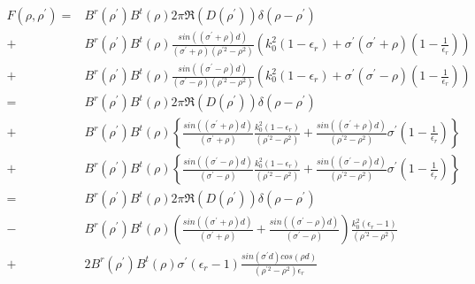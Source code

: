 \documentclass[11pt, oneside]{article}   	%
\begin{document}
\begin{align*}
F\left(\rho,\rho^{\prime}\right)= & B^{r}\left(\rho^{\prime}\right)B^{t}\left(\rho\right)2\pi\Re\left(D\left(\rho^{\prime}\right)\right)\delta\left(\rho-\rho^{\prime}\right)\\
+ & B^{r}\left(\rho^{\prime}\right)B^{t}\left(\rho\right)\frac{sin\left(\left(\sigma^{\prime}+\rho\right)d\right)}{\left(\sigma^{\prime}+\rho\right)\left(\rho^{\prime2}-\rho^{2}\right)}\left(k_{0}^{2}\left(1-\epsilon_{r}\right)+\sigma^{\prime}\left(\sigma^{\prime}+\rho\right)\left(1-\frac{1}{\epsilon_{r}}\right)\right)\\
+ & B^{r}\left(\rho^{\prime}\right)B^{t}\left(\rho\right)\frac{sin\left(\left(\sigma^{\prime}-\rho\right)d\right)}{\left(\sigma^{\prime}-\rho\right)\left(\rho^{\prime2}-\rho^{2}\right)}\left(k_{0}^{2}\left(1-\epsilon_{r}\right)+\sigma^{\prime}\left(\sigma^{\prime}-\rho\right)\left(1-\frac{1}{\epsilon_{r}}\right)\right)\\
= & B^{r}\left(\rho^{\prime}\right)B^{t}\left(\rho\right)2\pi\Re\left(D\left(\rho^{\prime}\right)\right)\delta\left(\rho-\rho^{\prime}\right)\\
+ & B^{r}\left(\rho^{\prime}\right)B^{t}\left(\rho\right)\left\{ \frac{sin\left(\left(\sigma^{\prime}+\rho\right)d\right)}{\left(\sigma^{\prime}+\rho\right)}\frac{k_{0}^{2}\left(1-\epsilon_{r}\right)}{\left(\rho^{\prime2}-\rho^{2}\right)}+\frac{sin\left(\left(\sigma^{\prime}+\rho\right)d\right)}{\left(\rho^{\prime2}-\rho^{2}\right)}\sigma^{\prime}\left(1-\frac{1}{\epsilon_{r}}\right)\right\} \\
+ & B^{r}\left(\rho^{\prime}\right)B^{t}\left(\rho\right)\left\{ \frac{sin\left(\left(\sigma^{\prime}-\rho\right)d\right)}{\left(\sigma^{\prime}-\rho\right)}\frac{k_{0}^{2}\left(1-\epsilon_{r}\right)}{\left(\rho^{\prime2}-\rho^{2}\right)}+\frac{sin\left(\left(\sigma^{\prime}-\rho\right)d\right)}{\left(\rho^{\prime2}-\rho^{2}\right)}\sigma^{\prime}\left(1-\frac{1}{\epsilon_{r}}\right)\right\} \\
= & B^{r}\left(\rho^{\prime}\right)B^{t}\left(\rho\right)2\pi\Re\left(D\left(\rho^{\prime}\right)\right)\delta\left(\rho-\rho^{\prime}\right)\\
- & B^{r}\left(\rho^{\prime}\right)B^{t}\left(\rho\right)\left(\frac{sin\left(\left(\sigma^{\prime}+\rho\right)d\right)}{\left(\sigma^{\prime}+\rho\right)}+\frac{sin\left(\left(\sigma^{\prime}-\rho\right)d\right)}{\left(\sigma^{\prime}-\rho\right)}\right)\frac{k_{0}^{2}\left(\epsilon_{r}-1\right)}{\left(\rho^{\prime2}-\rho^{2}\right)}\\
+ & 2B^{r}\left(\rho^{\prime}\right)B^{t}\left(\rho\right)\sigma^{\prime}\left(\epsilon_{r}-1\right)\frac{sin\left(\sigma^{\prime}d\right)cos\left(\rho d\right)}{\left(\rho^{\prime2}-\rho^{2}\right)\epsilon_{r}}
\end{align*}
\end{document}

